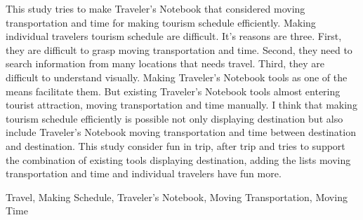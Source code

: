 \documentclass{funthesis}
\begin{document}
\maketitle       %

\begin{eabstract}
This study tries to make Traveler's Notebook that considered moving transportation and time for making tourism schedule efficiently.
Making individual travelers tourism schedule are difficult.
It's reasons are three. First, they are difficult to grasp moving transportation and time. Second, they need to search information from many locations that needs travel. Third,  they are difficult to understand visually.
Making Traveler's Notebook tools as one of the means facilitate them.
But existing Traveler's Notebook tools almost entering tourist attraction, moving transportation and time manually.
I think that making tourism schedule efficiently is possible not only displaying destination but also include Traveler's Notebook moving transportation and time between destination and destination.
This study consider fun in trip, after trip 
and tries to support the combination of existing tools displaying destination, adding the lists moving transportation and time and individual travelers have fun more.

\end{eabstract}

\begin{ekeyword}
Travel, Making Schedule, Traveler's Notebook, Moving Transportation, Moving Time
\end{ekeyword}
\end{document}
